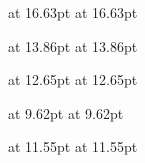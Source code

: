 {      %
      \jfont\chapmc{\txijamcfont} at 16.63pt
      \jfont\chapgt{\txijagtfont} at 16.63pt

      \jfont\secmc{\txijamcfont} at 13.86pt
      \jfont\secgt{\txijagtfont} at 13.86pt

      \jfont\ssecmc{\txijamcfont} at 12.65pt
      \jfont\ssecgt{\txijagtfont} at 12.65pt

      \jfont\reducedmc{\txijamcfont} at 9.62pt
      \jfont\reducedgt{\txijagtfont} at 9.62pt

      \jfont\shortcontmc{\txijamcfont} at 11.55pt
      \jfont\shortcontgt{\txijagtfont} at 11.55pt

    }


